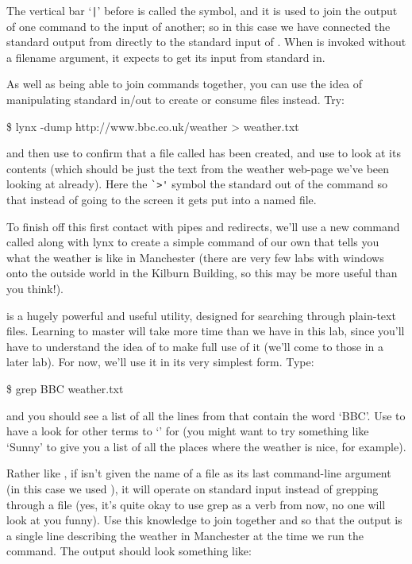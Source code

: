 The vertical bar `\verb-|-' before  is called the  symbol, and it is used to join the output of one command to the input of another; so in this case we have connected the standard output from  directly to the standard input of . When  is invoked without a filename argument, it expects to get its input from standard in.

As well as being  able to join commands together, you can use the idea of manipulating standard in/out to create or consume files instead. Try:

\begin{ttoutenv}
\$ lynx -dump http://www.bbc.co.uk/weather > weather.txt
\end{ttoutenv}

and then use  to confirm that a file called  has been created, and use  to look at its contents (which should be just the text from the weather web-page we've been looking at already). Here the \verb-`>'- symbol  the standard out of the  command so that instead of going to the screen it gets put into a named file.

To finish off this first contact with pipes and redirects, we'll use a new command called  along with lynx to create a simple command of our own that tells you what the weather is like in Manchester (there are very few labs with windows onto the outside world in the Kilburn Building, so this may be more useful than you think!).

 is a hugely powerful and useful utility, designed for searching through plain-text files. Learning to master  will take more time than we have in this lab, since you'll have to understand the idea of  to make full use of it (we'll come to those in a later lab). For now, we'll use it in its very simplest form. Type:

\begin{ttoutenv}
\$ grep BBC weather.txt
\end{ttoutenv}

and you should see a list of all the lines from  that contain the word `BBC'. Use  to have a look for other terms to `' for (you might want to try something like `Sunny' to give you a list of all the places where the weather is nice, for example).

Rather like , if  isn't given the name of a file as its last command-line argument (in this case we used ), it will operate on standard input instead of grepping through a file (yes, it's quite okay to use grep as a verb from now, no one will look at you funny). Use this knowledge to join together  and  so that the output is a single line describing the weather in Manchester at the time we run the command. The output should look something like:

